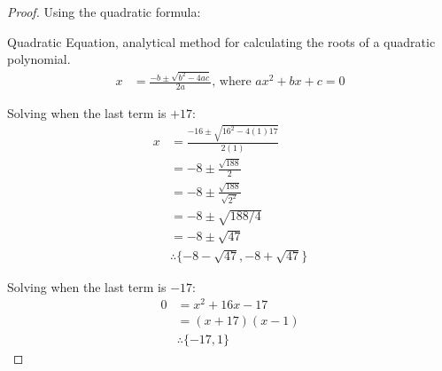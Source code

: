 \begin{enumerate}
\begin{proof}
    Using the quadratic formula:
    \begin{definition}{Quadratic Equation}, analytical method for calculating the roots of a quadratic polynomial.
      \begin{equation}
        \begin{split}
          x & = \frac{-b \pm{\sqrt{b^2 - 4ac}}}{2a} \text{, where } ax^2 + bx + c = 0
        \end{split}
      \end{equation}
    \end{definition}
    
    Solving when the last term is $+17$:
    \begin{equation}
      \begin{split}
        x & = \frac{-16 \pm{\sqrt{16^2 - 4(1)17}}}{2(1)} \\
        & = -8 \pm{\frac{\sqrt{188}}{2}} \\
        & = -8 \pm{\frac{\sqrt{188}}{\sqrt{2^2}}} \\
        & = -8 \pm{\sqrt{188/4}} \\
        & = -8 \pm{\sqrt{47}} \\
        & \therefore \{-8 - \sqrt{47}, -8 + \sqrt{47}\}
      \end{split}
    \end{equation}

    Solving when the last term is $-17$:
    \begin{equation}
      \begin{split}
        0 & = x^2 + 16x - 17 \\
        & = (x + 17)(x - 1) \\
        & \therefore \{-17, 1\}
      \end{split}
    \end{equation}
    
  \end{proof}


\end{enumerate}
